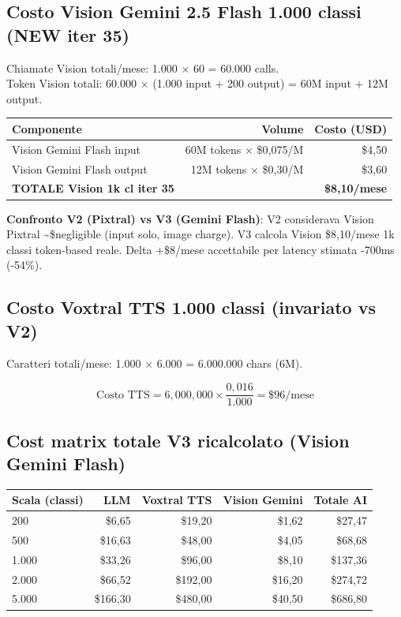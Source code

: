 \documentclass[12pt,a4paper]{article}
\begin{document}
\subsection*{Costo Vision Gemini 2.5 Flash 1.000 classi (NEW iter 35)}

Chiamate Vision totali/mese: 1.000 × 60 = 60.000 calls.\\
Token Vision totali: 60.000 × (1.000 input + 200 output) = 60M input + 12M output.

\begin{center}
\begin{tabular}{lrr}
\toprule
\textbf{Componente} & \textbf{Volume} & \textbf{Costo (USD)} \\
\midrule
Vision Gemini Flash input  & 60M tokens × \$0,075/M & \$4,50 \\
Vision Gemini Flash output & 12M tokens × \$0,30/M  & \$3,60 \\
\textbf{TOTALE Vision 1k cl iter 35} & & \textbf{\$8,10/mese} \\
\bottomrule
\end{tabular}
\end{center}

\textbf{Confronto V2 (Pixtral) vs V3 (Gemini Flash)}: V2 considerava Vision Pixtral \textasciitilde\$negligible (input solo, image charge). V3 calcola Vision \$8,10/mese 1k classi token-based reale. Delta +\$8/mese accettabile per latency stimata -700ms (-54\%).

\subsection*{Costo Voxtral TTS 1.000 classi (invariato vs V2)}

Caratteri totali/mese: 1.000 × 6.000 = 6.000.000 chars (6M).

\begin{equation*}
\text{Costo TTS} = 6{,}000{,}000 \times \frac{0{,}016}{1.000} = \$96/\text{mese}
\end{equation*}

\subsection*{Cost matrix totale V3 ricalcolato (Vision Gemini Flash)}

\begin{center}
\begin{tabular}{lrrrr}
\toprule
\textbf{Scala (classi)} & \textbf{LLM} & \textbf{Voxtral TTS} & \textbf{Vision Gemini} & \textbf{Totale AI} \\
\midrule
200    & \$6,65    & \$19,20   & \$1,62   & \$27,47   \\
500    & \$16,63   & \$48,00   & \$4,05   & \$68,68   \\
1.000  & \$33,26   & \$96,00   & \$8,10   & \$137,36  \\
2.000  & \$66,52   & \$192,00  & \$16,20  & \$274,72  \\
5.000  & \$166,30  & \$480,00  & \$40,50  & \$686,80  \\
\bottomrule
\end{tabular}
\end{center}
\end{document}
